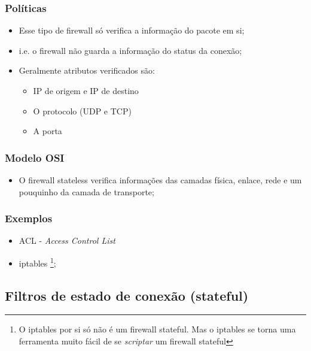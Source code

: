 \begin{frame}
	\frametitle{Políticas}
	\begin{itemize}
		\item Esse tipo de firewall só verifica a informação do pacote em si;
		\item i.e. o firewall não guarda a informação do status da conexão;
		\item Geralmente atributos verificados são:
			\begin{itemize}
				\item IP de origem e IP de destino
				\item O protocolo (UDP e TCP)
				\item A porta
			\end{itemize}
	\end{itemize}
\end{frame}

\begin{frame}
	\frametitle{Modelo OSI}

	\begin{itemize}
		\item O firewall stateless verifica informações das camadas física, enlace, rede e um pouquinho da camada de transporte;
	\end{itemize}

\end{frame}

\begin{frame}
	\frametitle{Exemplos}
	\begin{itemize}
		\item ACL - \textit{Access Control List}
		\item iptables \footnote{O iptables por si só não é um firewall stateful. Mas o iptables se torna uma ferramenta muito fácil de se \textit{scriptar} um firewall stateful};
	\end{itemize}
\end{frame}

\subsection{Filtros de estado de conexão (stateful)}

